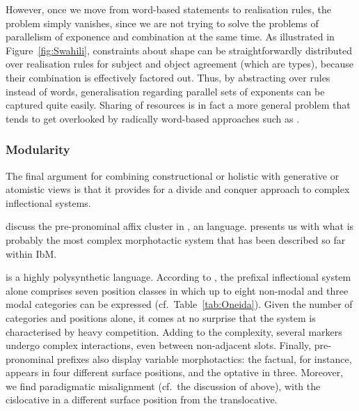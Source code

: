 \documentclass[output=paper,biblatex,babelshorthands,newtxmath,draftmode,colorlinks,citecolor=brown]{langscibook}
\begin{document}
\begin{exe}
\begin{xlist}
\begin{exe}
\begin{xlist}
\begin{figure*}
  \caption{Rule type hierarchy for Swahili parallel position classes \citep[356]{Crysmann:Bonami:2016}}
  \label{fig:Swahili}
\end{figure*}

However, once we move from word-based statements to realisation rules,
the problem simply vanishes, since we are not trying to solve the
problems of parallelism of exponence and combination at the same time.
As illustrated in Figure~\ref{fig:Swahili}, constraints about shape
can be straightforwardly distributed over realisation rules for
subject and object agreement (which are types), because their
combination is effectively factored out. Thus, by abstracting over
rules instead of words, generalisation regarding parallel sets of
exponents can be captured quite easily. Sharing of resources is in
fact a more general problem that tends to get overlooked by radically
word-based approaches such as \citet{Blevins14}.

\subsubsection{Modularity}

The final argument for combining constructional or holistic with
generative or atomistic views is that it provides for a divide and
conquer approach to complex inflectional systems.

\citet{diaz:koenig:michelson:19} discuss the pre-pronominal affix
cluster in , an  language.  presents us with what
is probably the most complex morphotactic system that has been
described so far within IbM.

 is a highly polysynthetic language. According to
\citet{diaz:koenig:michelson:19}, the prefixal inflectional system alone
comprises seven  position classes in which up to eight
non-modal and three modal categories can be expressed
(cf.\ Table~\ref{tab:Oneida}). Given the number of categories and
positions alone, it comes at no surprise that the system is
characterised by heavy competition. Adding to the complexity, several
markers undergo complex interactions, even between non-adjacent slots.
Finally,  pre-pronominal prefixes also display variable
morphotactics: the factual, for instance, appears in four different surface
positions, and the optative in three. Moreover, we find paradigmatic
misalignment (cf.\ the discussion of  above), with the
cislocative in a different surface position from the translocative.


\end{xlist}
\end{exe}
\end{xlist}
\end{exe}
\end{document}
